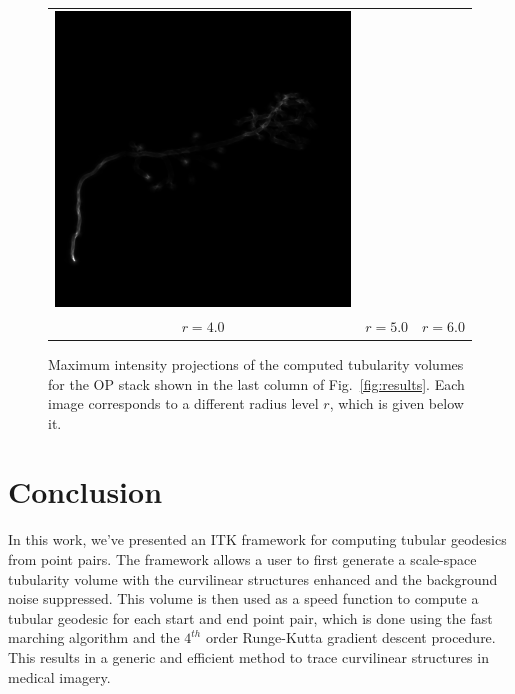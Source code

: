 \documentclass{InsightArticle}
\begin{document}
\begin{figure}[t]
\begin{tabular}{ccc}
    \includegraphics[width=0.31\columnwidth]{OP_1_11_max_scale_space_tubularity.png}  \\
    $r = 4.0$ & $r = 5.0$ & $r = 6.0$ \\
  \end{tabular}
  \caption{  \label{fig:mip_tubularity_images} Maximum intensity projections of the computed 
  tubularity volumes for the OP stack shown in the last column of Fig.~\ref{fig:results}. 
  Each image corresponds to a different radius level $r$, which is given below it.}
  \vspace{-0.3cm}
\end{figure}

\listcpluspluspsnip


\section{Conclusion}

In this work, we've presented an ITK framework for computing tubular geodesics from point pairs. The 
framework allows a user to first generate a scale-space tubularity volume with 
the curvilinear structures enhanced  and the background noise suppressed. This volume is then used 
as a speed function to compute a tubular geodesic for each start and end point pair, which is done using 
the fast marching algorithm and the $4^{th}$ order Runge-Kutta gradient descent procedure. This results 
in a generic and efficient method to trace curvilinear structures in medical imagery.



\end{document}
